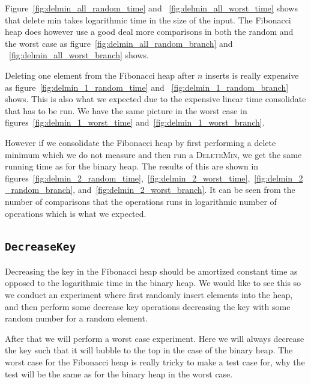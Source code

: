 \documentclass[a4paper,oneside,article,11pt]{memoir}
\begin{document}
Figure~\ref{fig:delmin_all_random_time} and ~\ref{fig:delmin_all_worst_time} shows that delete min takes logarithmic time in the size of the  input. The Fibonacci heap does however use a good deal more comparisons in both the random and the worst case as figure~\ref{fig:delmin_all_random_branch} and ~\ref{fig:delmin_all_worst_branch} shows.

Deleting one element from the Fibonacci heap after $n$ inserts is really expensive as figure~\ref{fig:delmin_1_random_time} and ~\ref{fig:delmin_1_random_branch} shows. This is also what we expected due to the expensive linear time consolidate that has to be run. We have the same picture in the worst case in figures~\ref{fig:delmin_1_worst_time} and~\ref{fig:delmin_1_worst_branch}.

However if we consolidate the Fibonacci heap by first performing a delete minimum which we do not measure and then run a \textsc{DeleteMin}, we get the same running time as for the binary heap. The results of this are shown in figures~\ref{fig:delmin_2_random_time},~\ref{fig:delmin_2_worst_time},~\ref{fig:delmin_2_random_branch}, and~\ref{fig:delmin_2_worst_branch}. It can be seen from the number of comparisons that the operations runs in logarithmic number of operations which is what we expected.

\subsection{\texttt{DecreaseKey}}
Decreasing the key in the Fibonacci heap should be amortized constant time as opposed to the logarithmic time in the binary heap. We would like to see this so we conduct an experiment where first randomly insert elements into the heap, and then perform some decrease key operations decreasing the key with some random number for a random element.

After that we will perform a worst case experiment. Here we will always decrease the key such that it will bubble to the top in the case of the binary heap. The worst case for the Fibonacci heap is really tricky to make a test case for, why the test will be the same as for the binary heap in the worst case.
\end{document}
